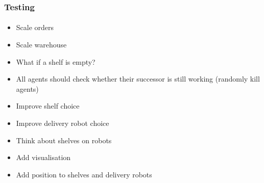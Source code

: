 \documentclass{beamer}
\begin{document}



\begin{frame}[fragile]
\frametitle{Testing}
\framesubtitle{}

\begin{itemize}
\item Scale orders
\item Scale warehouse
\item What if a shelf is empty?
\item All agents should check whether their successor is still working (randomly kill agents)
\item Improve shelf choice
\item Improve delivery robot choice
\item Think about shelves on robots
\item Add visualisation
\item Add position to shelves and delivery robots
\end{itemize}

\end{frame}





%


%
\end{document}
